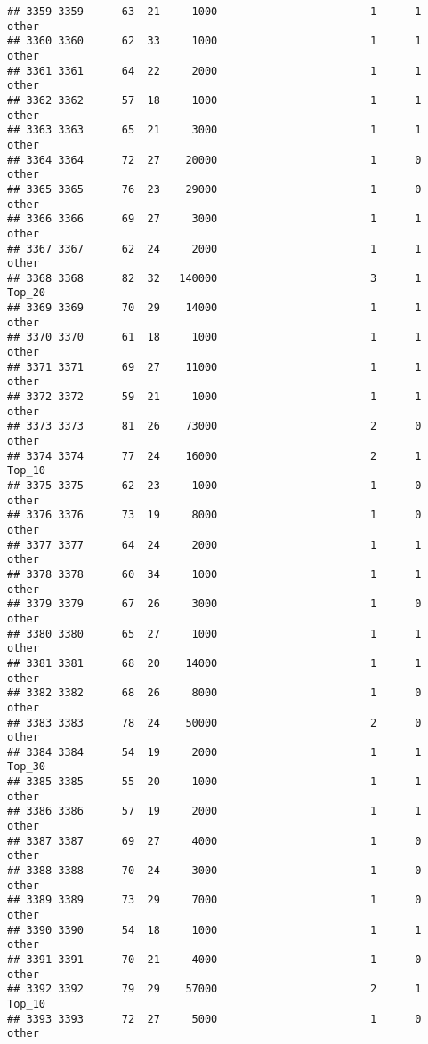 \documentclass[
]{article}
\begin{document}
\begin{verbatim}
## 3359 3359      63  21     1000                        1      1    other
## 3360 3360      62  33     1000                        1      1    other
## 3361 3361      64  22     2000                        1      1    other
## 3362 3362      57  18     1000                        1      1    other
## 3363 3363      65  21     3000                        1      1    other
## 3364 3364      72  27    20000                        1      0    other
## 3365 3365      76  23    29000                        1      0    other
## 3366 3366      69  27     3000                        1      1    other
## 3367 3367      62  24     2000                        1      1    other
## 3368 3368      82  32   140000                        3      1   Top_20
## 3369 3369      70  29    14000                        1      1    other
## 3370 3370      61  18     1000                        1      1    other
## 3371 3371      69  27    11000                        1      1    other
## 3372 3372      59  21     1000                        1      1    other
## 3373 3373      81  26    73000                        2      0    other
## 3374 3374      77  24    16000                        2      1   Top_10
## 3375 3375      62  23     1000                        1      0    other
## 3376 3376      73  19     8000                        1      0    other
## 3377 3377      64  24     2000                        1      1    other
## 3378 3378      60  34     1000                        1      1    other
## 3379 3379      67  26     3000                        1      0    other
## 3380 3380      65  27     1000                        1      1    other
## 3381 3381      68  20    14000                        1      1    other
## 3382 3382      68  26     8000                        1      0    other
## 3383 3383      78  24    50000                        2      0    other
## 3384 3384      54  19     2000                        1      1   Top_30
## 3385 3385      55  20     1000                        1      1    other
## 3386 3386      57  19     2000                        1      1    other
## 3387 3387      69  27     4000                        1      0    other
## 3388 3388      70  24     3000                        1      0    other
## 3389 3389      73  29     7000                        1      0    other
## 3390 3390      54  18     1000                        1      1    other
## 3391 3391      70  21     4000                        1      0    other
## 3392 3392      79  29    57000                        2      1   Top_10
## 3393 3393      72  27     5000                        1      0    other

\end{verbatim}
\end{document}
